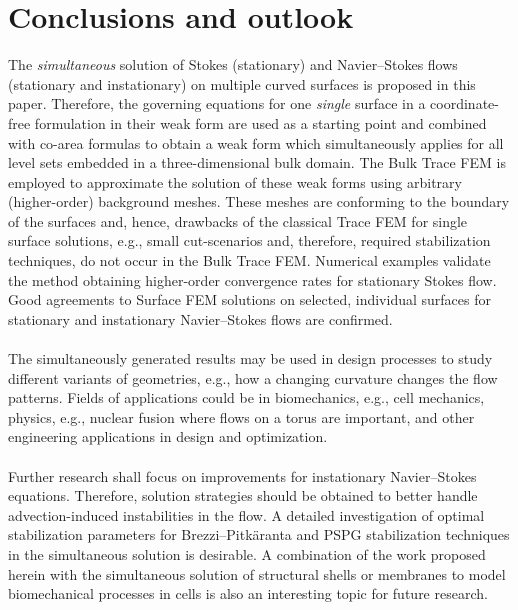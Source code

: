 \documentclass[12pt, twoside, english]{article}
\numberwithin{equation}{section}
\begin{document}
\section{Conclusions and outlook}\label{sec:ConclOutlook}
The \emph{simultaneous} solution of Stokes (stationary) and Navier--Stokes flows (stationary and instationary) on multiple curved surfaces is proposed in this paper. Therefore, the governing equations for one \emph{single} surface in a coordinate-free formulation in their weak form are used as a starting point and combined  with co-area formulas to obtain a weak form which simultaneously applies for all level sets embedded in a three-dimensional bulk domain. The Bulk Trace FEM is employed to approximate the solution of these weak forms using arbitrary (higher-order) background meshes. These meshes are conforming to the boundary of the surfaces and, hence, drawbacks of the classical Trace FEM for single surface solutions, e.g., small cut-scenarios and, therefore, required stabilization techniques, do not occur in the Bulk Trace FEM. Numerical examples validate the method obtaining higher-order convergence rates for stationary Stokes flow. Good agreements to Surface FEM solutions on selected, individual surfaces for stationary and instationary Navier--Stokes flows are confirmed.\\
\\
The simultaneously generated results may be used in design processes to study different variants of geometries, e.g., how a changing curvature changes the flow patterns. Fields of applications could be in biomechanics, e.g., cell mechanics, physics, e.g., nuclear fusion where flows on a torus are important, and other engineering applications in design and optimization.\\
\\
Further research shall focus on improvements for instationary Navier--Stokes equations. Therefore, solution strategies should be obtained to better handle advection-induced instabilities in the flow. A detailed investigation of optimal stabilization parameters for Brezzi--Pitkäranta and PSPG stabilization techniques in the simultaneous solution is desirable. A combination of the work proposed herein with the simultaneous solution of structural shells or membranes to model biomechanical processes in cells is also an interesting topic for future research.

%


\printbibliography


 
\end{document}
